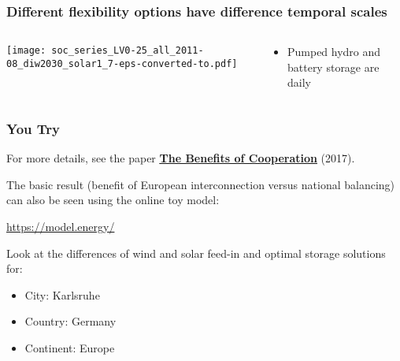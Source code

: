 \documentclass[10pt,aspectratio=169,dvipsnames]{beamer}
\let\olditem\item
\renewcommand{\item}{%
\olditem\vspace{5pt}}
\begin{document}
\begin{frame}
  \frametitle{Different flexibility options have difference temporal scales}

\begin{columns}[T]
  \begin{column}{10.5cm}

    \vspace{0.5cm}
  \texttt{[image: soc\_series\_LV0-25\_all\_2011-08\_diw2030\_solar1\_7-eps-converted-to.pdf]}

  \end{column}

  \begin{column}{3cm}
        \vspace{2cm}
    \begin{itemize}
    \item Pumped hydro and battery storage are \alert{daily}
    \end{itemize}

  \end{column}

\end{columns}
\end{frame}


\begin{frame}
  \frametitle{You Try}

  For more details, see the paper \href{https://arxiv.org/abs/1704.05492}{\bf\color{blue}\underline{The Benefits of Cooperation}} (2017).


  The basic result (benefit of European interconnection versus national balancing) can also be seen using the online toy model:

  \vspace{.5cm}
  \centering
  \url{https://model.energy/}
  \vspace{.5cm}

  \raggedright
  Look at the differences of wind and solar feed-in and optimal storage solutions for:
  \begin{itemize}
  \item \alert{City: Karlsruhe}
  \item \alert{Country: Germany}
    \item \alert{Continent: Europe}
  \end{itemize}

\end{frame}
\end{document}
